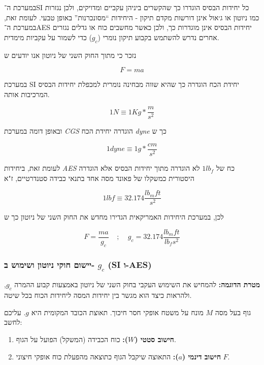 \documentclass[
  hebrew,
  letterpaper,
  DIV=11,
  numbers=noendperiod]{scrreprt}
\providecommand{\tightlist}{%
  \setlength{\itemsep}{0pt}\setlength{\parskip}{0pt}}
\begin{document}
במערכת ה־SI כל יחידות הבסיס הוגדרו כך שהקשרים ביניהן עקביים ומדויקים,
ולכן נגזרות כמו ניוטון או ג׳אול אינן דורשות מקדם תיקון - היחידות
``מסונכרנות'' באופן טבעי. לעומת זאת, במערכת ה־AES יחידות הבסיס אינן
מוגדרות כך, ולכן כאשר מחשבים כוח או גדלים נגזרים אחרים נדרש להשתמש בקבוע
תיקון נומרי (\(g_{c}\)) כדי לשמור על עקביות מימדית.

{נזכר כי מתוך החוק השני של ניוטון אנו יודעים ש}

\[F = ma\]

{במערכת} SI {יחידת הכח הוגדרה כך שהיא שווה מבחינה נומרית למכפלת יחידות
הבסיס המרכיבות אותה.}

\[1N \equiv 1Kg*\frac{m}{s^{2}}\]

{ובאופן דומה במערכת} \emph{CGS} {הוגדרה יחידת הכח} \emph{dyne} {כך ש}

\[1dyne \equiv 1g*\frac{cm}{s^{2}}\]

{לעומת זאת, ביחידות} \emph{AES} {כח של} \(1lb_{f}\) {לא הוגדרה מתוך
יחידות הבסיס אלא הוגדרה היסטורית כמשקלו של פאונד מסה אחד בתנאי כבידה
סטנדרטיים, ז"א}

\[1lbf \equiv 32.174\frac{lb_{m}ft}{s^{2}}\]

{לכן, במערכת היחידות האמריקאית הגדירו מחדש את החוק השני של ניוטון כך ש}

\[F = \frac{ma}{g_{c}}\ \ \ \ \ ;\ \ \ \ \ g_{c} = 32.174\frac{lb_{m}ft}{lb_{f}s^{2}}\]

\subsubsection{\texorpdfstring{יישום חוקי ניוטון ושימוש ב- \(g_c\) (SI
ו-AES)}{יישום חוקי ניוטון ושימוש ב- g\_c (SI ו-AES)}}\label{ux5d9ux5d9ux5e9ux5d5ux5dd-ux5d7ux5d5ux5e7ux5d9-ux5e0ux5d9ux5d5ux5d8ux5d5ux5df-ux5d5ux5e9ux5d9ux5deux5d5ux5e9-ux5d1--g_c-si-ux5d5-aes}

\textbf{מטרת הדוגמה:} להמחיש את השימוש העקבי בחוק השני של ניוטון באמצעות
קבוע ההמרה \(g_c\), ולהראות כיצד הוא מגשר בין יחידות המסה ליחידות הכוח
בכל שיטה.

גוף בעל מסה \(M\) מונח על משטח אופקי חסר חיכוך. תאוצת הכובד המקומית היא
\(g\). עליכם לחשב:

\begin{enumerate}
\def\labelenumi{\arabic{enumi}.}
\tightlist
\item
  \textbf{חישוב סטטי (\(W\)):} כוח הכבידה (המשקל) הפועל על הגוף.
\item
  \textbf{חישוב דינמי (\(a\)):} התאוצה שיקבל הגוף כתוצאה מהפעלת כוח
  אופקי חיצוני \(F\).
\end{enumerate}
\end{document}
